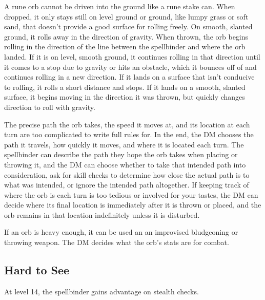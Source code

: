 A rune orb cannot be driven into the ground like a rune stake can. When dropped, it only stays still on level ground or ground, like lumpy grass or soft sand, that doesn't provide a good surface for rolling freely. On smooth, slanted ground, it rolls away in the direction of gravity. When thrown, the orb begins rolling in the direction of the line between the spellbinder and where the orb landed. If it is on level, smooth ground, it continues rolling in that direction until it comes to a stop due to gravity or hits an obstacle, which it bounces off of and continues rolling in a new direction. If it lands on a surface that isn't conducive to rolling, it rolls a short distance and stops. If it lands on a smooth, slanted surface, it begins moving in the direction it was thrown, but quickly changes direction to roll with gravity.

The precise path the orb takes, the speed it moves at, and its location at each turn are too complicated to write full rules for. In the end, the DM chooses the path it travels, how quickly it moves, and where it is located each turn. The spellbinder can describe the path they hope the orb takes when placing or throwing it, and the DM can choose whether to take that intended path into consideration, ask for skill checks to determine how close the actual path is to what was intended, or ignore the intended path altogether. If keeping track of where the orb is each turn is too tedious or involved for your tastes, the DM can decide where its final location is immediately after it is thrown or placed, and the orb remains in that location indefinitely unless it is disturbed.

If an orb is heavy enough, it can be used an an improvised bludgeoning or throwing weapon. The DM decides what the orb's stats are for combat.

\subsection{Hard to See}
At level 14, the spellbinder gains advantage on stealth checks.